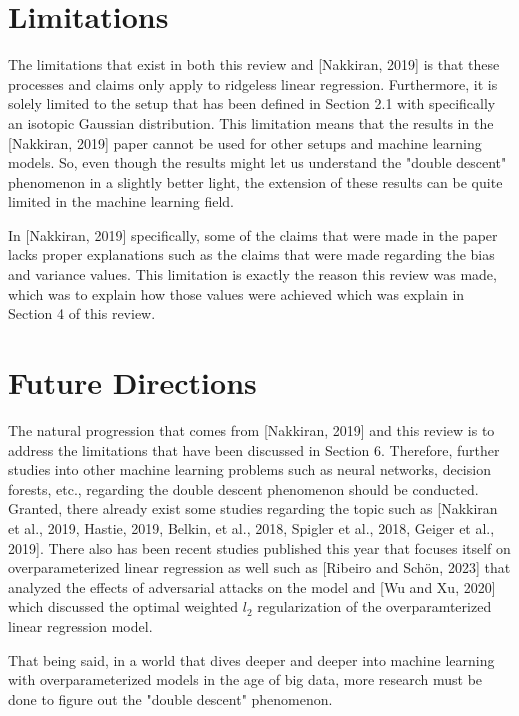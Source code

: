 \documentclass{article}
\begin{document}
\section{Limitations}

The limitations that exist in both this review and [Nakkiran, 2019] is that these processes and claims only apply to ridgeless linear regression. Furthermore, it is solely limited to the setup that has been defined in Section 2.1 with specifically an isotopic Gaussian distribution. This limitation means that the results in the [Nakkiran, 2019] paper cannot be used for other setups and machine learning models. So, even though the results might let us understand the "double descent" phenomenon in a slightly better light, the extension of these results can be quite limited in the machine learning field.

In [Nakkiran, 2019] specifically, some of the claims that were made in the paper lacks proper explanations such as the claims that were made regarding the bias and variance values. This limitation is exactly the reason this review was made, which was to explain how those values were achieved which was explain in Section 4 of this review.



\section{Future Directions}

The natural progression that comes from [Nakkiran, 2019] and this review is to address the limitations that have been discussed in Section 6. Therefore, further studies into other machine learning problems such as neural networks, decision forests, etc., regarding the double descent phenomenon should be conducted. Granted, there already exist some studies regarding the topic such as [Nakkiran et al., 2019, Hastie, 2019, Belkin, et al., 2018, Spigler et al., 2018, Geiger et al., 2019]. There also has been recent studies published this year that focuses itself on overparameterized linear regression as well such as [Ribeiro and Schön, 2023] that analyzed the effects of adversarial attacks on the model and [Wu and Xu, 2020] which discussed the optimal weighted $l_2$ regularization of the overparamterized linear regression model.

That being said, in a world that dives deeper and deeper into machine learning with overparameterized models in the age of big data, more research must be done to figure out the "double descent" phenomenon.
\end{document}

